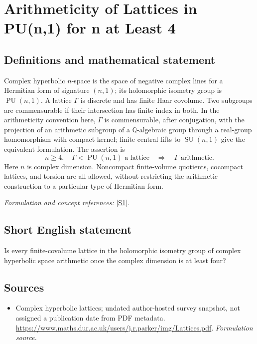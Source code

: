 \documentclass[11pt]{article}
\begin{document}
\section*{\texorpdfstring{Arithmeticity of Lattices in PU(n,1) for n at Least 4}{Arithmeticity of Lattices in PU(n,1) for n at Least 4}}\label{statement}
\subsection{Definitions and mathematical statement}
Complex hyperbolic $n$-space is the space of negative complex lines for a Hermitian form of signature $(n,1)$; its holomorphic isometry group is $\operatorname{PU}(n,1)$. A lattice $\Gamma$ is discrete and has finite Haar covolume. Two subgroups are commensurable if their intersection has finite index in both. In the arithmeticity convention here, $\Gamma$ is commensurable, after conjugation, with the projection of an arithmetic subgroup of a ${\mathbb{Q}}$-algebraic group through a real-group homomorphism with compact kernel; finite central lifts to $\operatorname{SU}(n,1)$ give the equivalent formulation. The assertion is
\[
 n\ge4,\quad\Gamma<\operatorname{PU}(n,1)\text{ a lattice}
 \quad\Longrightarrow\quad\Gamma\text{ arithmetic}.
\]
Here $n$ is complex dimension. Noncompact finite-volume quotients, cocompact lattices, and torsion are all allowed, without restricting the arithmetic construction to a particular type of Hermitian form.
\par\smallskip\textit{Formulation and concept references:} \href{https://www.maths.dur.ac.uk/users/j.r.parker/img/Lattices.pdf}{[S1]}.

\subsection{Short English statement}
Is every finite-covolume lattice in the holomorphic isometry group of complex hyperbolic space arithmetic once the complex dimension is at least four?
\subsection{Sources}
\begin{itemize}
\item[S1]Complex hyperbolic lattices; undated author-hosted survey snapshot, not assigned a publication date from PDF metadata.
\url{https://www.maths.dur.ac.uk/users/j.r.parker/img/Lattices.pdf}.
\textit{Formulation source.}
\end{itemize}
\end{document}
